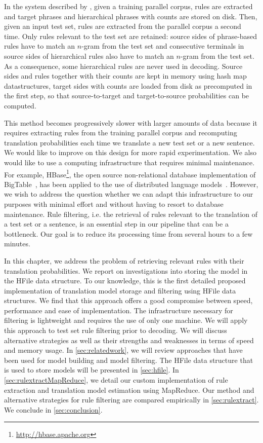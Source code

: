 In the system
described by \citet{iglesias-degispert-banga-byrne:2009:NAACL},
given a training parallel corpus, rules are extracted and target
phrases and hierarchical phrases with counts are stored on disk.
Then, given an input test set, rules are extracted from the parallel
corpus a second time. Only rules relevant to the test set
are retained: source sides of phrase-based rules have to match
an $n$-gram from the test set and consecutive terminals
in source sides of hierarchical rules also have to match
an $n$-gram from the test set. As a consequence, some hierarchical
rules are never used in decoding. %
Source sides and rules together with their counts are kept
in memory using hash map datastructures, target sides with counts
are loaded from disk as precomputed in the first step, so that
source-to-target and target-to-source probabilities can be computed.

This
method becomes progressively slower with larger amounts of data
because it requires extracting rules from the training parallel corpus
and recomputing translation probabilities
each time we translate a new test set or a new
sentence. We
would like to improve on this design for more rapid experimentation. We also would like
to use a computing infrastructure that requires minimal maintenance. For example,
HBase\footnote{\url{http://hbase.apache.org}}, the open source non-relational database
implementation of
BigTable~\citep{chang-dean-ghemawat-hsieh-wallach-burrows-chandra-fikes-gruber:2008:ACM}, has been applied to the use of distributed language
models~\citep{yu:2008:mastersthesis}. However, we wish to address the question
whether we can adapt this infrastructure to our purposes with minimal
effort and without having to resort to database maintenance.
Rule filtering, i.e. the retrieval of rules relevant to the translation
of a test set or a sentence, is an essential step in our pipeline that can be a
bottleneck. Our goal is to reduce its processing time from several hours to a
few minutes.

In this chapter, we address the problem of retrieving relevant rules with their
translation probabilities. We report on investigations into
storing the model in the HFile data
structure. To our knowledge, this is the first
detailed proposed implementation of translation model storage and
filtering using HFile data structures. We find that this approach
offers a good compromise
between speed, performance and ease of implementation. The infrastructure necessary
for filtering is lightweight and requires the use of only one machine. We will
apply this approach to test set rule filtering prior
to decoding. We will discuss alternative
strategies as well as their strengths and weaknesses in terms of speed and
memory usage. In \autoref{sec:relatedwork}, we will review approaches that
have been used for model building and model filtering.
The HFile data structure that is used to
store models will be presented in \autoref{sec:hfile}.
In \autoref{sec:rulextractMapReduce}, we detail our custom implementation
of rule extraction and translation model estimation using
MapReduce. Our method and
alternative strategies for rule filtering are compared empirically in
\autoref{sec:rulextract}. We conclude in \autoref{sec:conclusion}.

